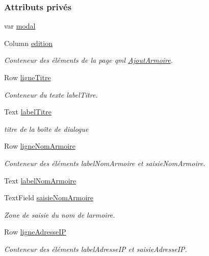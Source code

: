 \subsubsection*{Attributs privés}
\begin{DoxyCompactItemize}
\item 
var \hyperlink{class_ajout_armoire_a2f1636a6c6c09502847c0e026f3d24c9}{modal}
\item 
Column \hyperlink{class_ajout_armoire_a4b5288c454ddcf0cebf53af3573f1d17}{edition}
\begin{DoxyCompactList}\small\item\em Conteneur des éléments de la page qml \hyperlink{class_ajout_armoire}{Ajout\+Armoire}. \end{DoxyCompactList}\item 
Row \hyperlink{class_ajout_armoire_a22ebe30c1769fed22e5f3bb73d51336a}{ligne\+Titre}
\begin{DoxyCompactList}\small\item\em Conteneur du texte label\+Titre. \end{DoxyCompactList}\item 
Text \hyperlink{class_ajout_armoire_a813ab4e753d77b19f59cb4f8987dd2a4}{label\+Titre}
\begin{DoxyCompactList}\small\item\em titre de la boîte de dialogue \end{DoxyCompactList}\item 
Row \hyperlink{class_ajout_armoire_a77ace50cc7c925c3d1ca4f5bda69f629}{ligne\+Nom\+Armoire}
\begin{DoxyCompactList}\small\item\em Conteneur des éléments label\+Nom\+Armoire et saisie\+Nom\+Armoire. \end{DoxyCompactList}\item 
Text \hyperlink{class_ajout_armoire_aeb1eb00a9ccb7c08945b4565e28c9f78}{label\+Nom\+Armoire}
\item 
Text\+Field \hyperlink{class_ajout_armoire_a7f816d7c8df70b18528bf260b43408d9}{saisie\+Nom\+Armoire}
\begin{DoxyCompactList}\small\item\em Zone de saisie du nom de l\textquotesingle{}armoire. \end{DoxyCompactList}\item 
Row \hyperlink{class_ajout_armoire_a46e595b0f26c94aaa7b4f7861ee34ae2}{ligne\+Adresse\+IP}
\begin{DoxyCompactList}\small\item\em Conteneur des éléments label\+Adresse\+IP et saisie\+Adresse\+IP. \end{DoxyCompactList}\item 

\end{DoxyCompactItemize}

